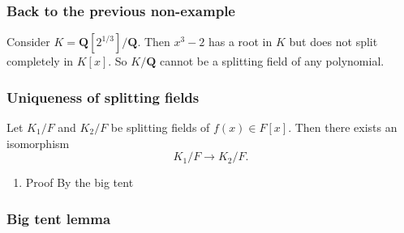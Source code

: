 \documentclass[11pt]{article}
\begin{document}
\subsubsection{Back to the previous non-example}
\label{sec:org623a4e3}
Consider \(K = \mathbf{Q}[2^{1/3}] / \mathbf{Q}\).
Then \(x^3-2\) has a root in \(K\) but does not split completely in \(K[x]\).
So \(K / \mathbf{Q}\) cannot be a splitting field of any polynomial.
\subsubsection{Uniqueness of splitting fields}
\label{sec:orgc07e7db}
Let \(K_1/F\) and \(K_2/F\) be splitting fields of \(f(x) \in F[x]\).
Then there exists an isomorphism
\[ K_1/F \to K_2/F.\]
\begin{enumerate}
\item Proof
\label{sec:org3f478ab}
By the big tent
\end{enumerate}
\subsubsection{Big tent lemma}
\label{sec:org60443e1}
\end{document}
